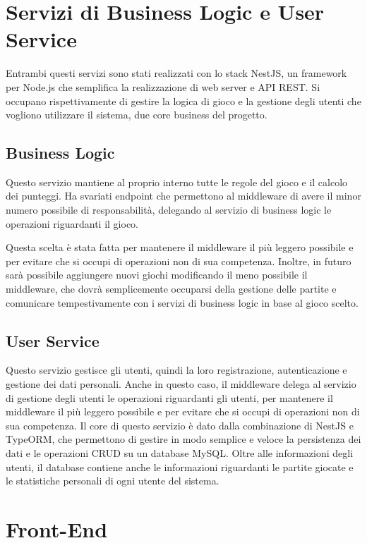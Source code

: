 \section{Servizi di Business Logic e User Service}

Entrambi questi servizi sono stati realizzati con lo stack NestJS, un framework per Node.js che semplifica la realizzazione di web server e API REST.
Si occupano rispettivamente di gestire la logica di gioco e la gestione degli utenti che vogliono utilizzare il sistema, due core business del progetto.

\subsection{Business Logic}

Questo servizio mantiene al proprio interno tutte le regole del gioco e il calcolo dei punteggi. 
Ha svariati endpoint che permettono al middleware di avere il minor numero possibile di responsabilità, delegando al servizio di business logic le operazioni riguardanti il gioco.

Questa scelta è stata fatta per mantenere il middleware il più leggero possibile e per evitare che si occupi di operazioni non di sua competenza. Inoltre, in futuro sarà possibile aggiungere nuovi giochi modificando il meno possibile il middleware, che dovrà semplicemente occuparsi della gestione delle partite e comunicare tempestivamente con i servizi di business logic in base al gioco scelto.

\subsection{User Service}

Questo servizio gestisce gli utenti, quindi la loro registrazione, autenticazione e gestione dei dati personali.
Anche in questo caso, il middleware delega al servizio di gestione degli utenti le operazioni riguardanti gli utenti, per mantenere il middleware il più leggero possibile e per evitare che si occupi di operazioni non di sua competenza.
Il core di questo servizio è dato dalla combinazione di NestJS e TypeORM, che permettono di gestire in modo semplice e veloce la persistenza dei dati e le operazioni CRUD su un database MySQL.
Oltre alle informazioni degli utenti, il database contiene anche le informazioni riguardanti le partite giocate e le statistiche personali di ogni utente del sistema.

\section{Front-End}

